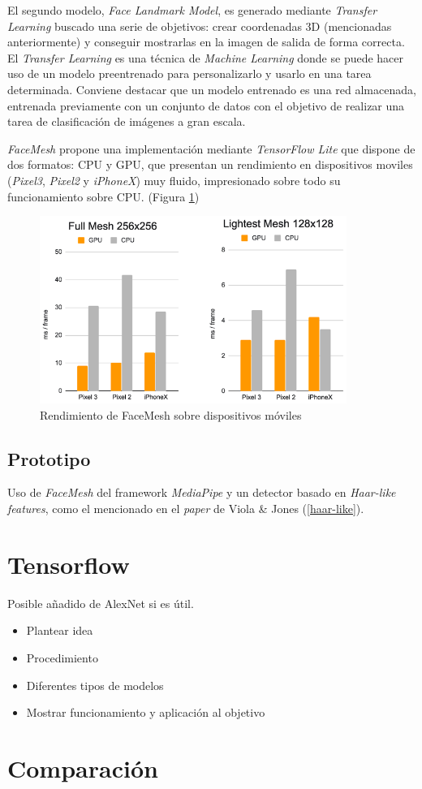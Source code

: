 El segundo modelo, \textit{Face Landmark Model}, es generado mediante \textit{Transfer Learning} buscado una serie de objetivos: crear coordenadas 3D (mencionadas anteriormente) y conseguir mostrarlas en la imagen de salida de forma correcta. \cite{faceMesh} El \textit{Transfer Learning} es una técnica de \textit{Machine Learning} donde se puede hacer uso de un modelo preentrenado para personalizarlo y usarlo en una tarea determinada. Conviene destacar que un modelo entrenado es una red almacenada, entrenada previamente con un conjunto de datos con el objetivo de realizar una tarea de clasificación de imágenes a gran escala. \cite{transferLearning}

\textit{FaceMesh} propone una implementación mediante \textit{TensorFlow Lite} que dispone de dos formatos: CPU y GPU, que presentan un rendimiento en dispositivos moviles (\textit{Pixel3}, \textit{Pixel2} y \textit{iPhoneX}) muy fluido, impresionado sobre todo su funcionamiento sobre CPU. (Figura \ref{fig:faceMeshRen}) \cite{faceMesh3}

\begin{figure}[htp]
	\centering
	\includegraphics[width=10cm]{imagenes/rendFaceMesh.png}
	\caption{Rendimiento de FaceMesh sobre dispositivos móviles}
	\label{fig:faceMeshRen}
\end{figure}

\subsection*{Prototipo}

Uso de \textit{FaceMesh} del framework \textit{MediaPipe} y un detector basado en \textit{Haar-like features}, como el mencionado en el \textit{paper} de Viola \& Jones (\ref{haar-like}).


\newpage
\section{Tensorflow}

Posible añadido de AlexNet si es útil.

\begin{itemize}
	\item Plantear idea
	\item Procedimiento
	\item Diferentes tipos de modelos
	\item Mostrar funcionamiento y aplicación al objetivo
\end{itemize}

\newpage
\section{Comparación}
